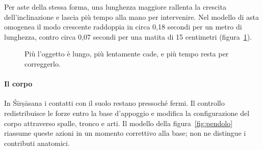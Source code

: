 \documentclass[11pt,a4paper,twoside=false,headinclude,footinclude]{scrartcl}
\newcommand{\mano}[1][]{%
  \begin{scope}[#1]
    \draw[corpo] (-1.05,-0.16) -- (-0.30,0) -- (0.30,0) -- (0.40,0.12);
  \end{scope}}
\begin{document}
Per aste della stessa forma, una lunghezza maggiore rallenta la crescita dell'inclinazione e lascia più tempo alla mano per intervenire. Nel modello di asta omogenea il modo crescente raddoppia in circa 0,18 secondi per un metro di lunghezza, contro circa 0,07 secondi per una matita di 15 centimetri (figura~\ref{fig:lungocorto}).

\begin{figure}[htbp]
\centering
{}
\caption{Più l'oggetto è lungo, più lentamente cade, e più tempo resta per correggerlo.}
\label{fig:lungocorto}
\end{figure}

\paragraph{Il corpo} In Śīrṣāsana i contatti con il suolo restano pressoché fermi. Il controllo redistribuisce le forze entro la base d'appoggio e modifica la configurazione del corpo attraverso spalle, tronco e arti. Il modello della figura~\ref{fig:pendolo} riassume queste azioni in un momento correttivo alla base; non ne distingue i contributi anatomici.
\end{document}

